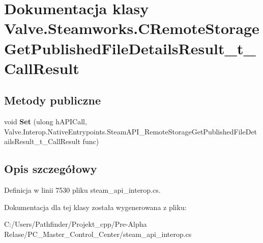 \hypertarget{class_valve_1_1_steamworks_1_1_c_remote_storage_get_published_file_details_result__t___call_result}{}\section{Dokumentacja klasy Valve.\+Steamworks.\+C\+Remote\+Storage\+Get\+Published\+File\+Details\+Result\+\_\+t\+\_\+\+Call\+Result}
\label{class_valve_1_1_steamworks_1_1_c_remote_storage_get_published_file_details_result__t___call_result}
\subsection*{Metody publiczne}
\begin{DoxyCompactItemize}
\item 
\mbox{\label{class_valve_1_1_steamworks_1_1_c_remote_storage_get_published_file_details_result__t___call_result_ace7fd0ab81a879ecf2f38357eb17a164}} 
void {\bfseries Set} (ulong h\+A\+P\+I\+Call, Valve.\+Interop.\+Native\+Entrypoints.\+Steam\+A\+P\+I\+\_\+\+Remote\+Storage\+Get\+Published\+File\+Details\+Result\+\_\+t\+\_\+\+Call\+Result func)
\end{DoxyCompactItemize}


\subsection{Opis szczegółowy}


Definicja w linii 7530 pliku steam\+\_\+api\+\_\+interop.\+cs.



Dokumentacja dla tej klasy została wygenerowana z pliku\+:\begin{DoxyCompactItemize}
\item 
C\+:/\+Users/\+Pathfinder/\+Projekt\+\_\+cpp/\+Pre-\/\+Alpha Relase/\+P\+C\+\_\+\+Master\+\_\+\+Control\+\_\+\+Center/steam\+\_\+api\+\_\+interop.\+cs\end{DoxyCompactItemize}
